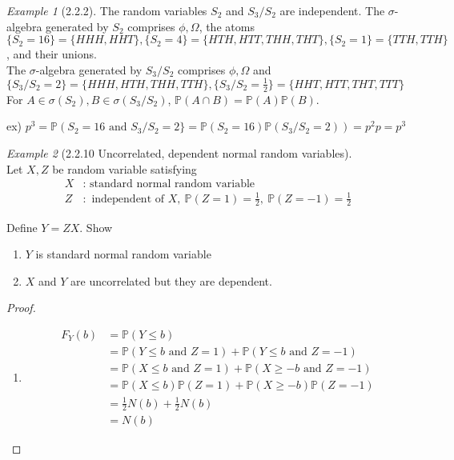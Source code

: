 \documentclass[12pt]{report}
\renewcommand{\1}{\mathbb{1}}
\theoremstyle{break}
\theoremstyle{newdef}
\theoremstyle{remark}
\newtheorem*{exmp}{Example} %
\begin{document}
\begin{appendices}
\begin{exmp}[2.2.2]
The random variables $S_2$ and $S_3/S_2$ are independent.
The $\sigma$-algebra generated by $S_2$ comprises $\phi, \Omega$, the atoms\\
$\{S_2 = 16\} = \{ HHH, HHT\}
, \{S_2=  4\} = \{ HTH, HTT, THH, THT\}
, \{S_2 = 1\} = \{TTH, TTH\}$, and their unions.\\

The $\sigma$-algebra generated by $S_3/S_2$ comprises $\phi, \Omega$ and\\
$\{S_3/S_2 = 2\} = \{HHH, HTH, THH, TTH\}
, \{S_3/S_2 = \frac{1}{2} \} = \{ HHT, HTT, THT, TTT\}$\\

For $A \in \sigma(S_2), B \in \sigma(S_3/S_2)$,
$\mathbb{P}(A \cap B) = \mathbb{P}(A)\mathbb{P}(B)$.

ex) $p^3 = \mathbb{P}(S_2 = 16 \text{ and } S_3/S_2 = 2\} = \mathbb{P}(S_2 = 16)\mathbb{P}(S_3/S_2 = 2)) = p^2 p = p^3$

\end{exmp}

\vspace{5mm}

\begin{exmp}[2.2.10 Uncorrelated, dependent normal random variables]
\leavevmode\\
Let $X, Z$ be random variable satisfying
$$
\begin{aligned}
X&: \text{ standard normal random variable}\\
Z&: \text{ independent of } X,\ \mathbb{P}(Z = 1) = \frac{1}{2},\ \mathbb{P}(Z = -1) = \frac{1}{2}
\end{aligned}
$$

Define $Y = ZX$.
Show
\begin{enumerate}
\item $Y$ is standard normal random variable
\item $X$ and $Y$ are uncorrelated but they are dependent.
\end{enumerate}


\begin{proof}
\leavevmode
\begin{enumerate}
\item
$$
\begin{aligned}
F_Y(b) &= \mathbb{P}(Y \leq b)\\
&= \mathbb{P}(Y \leq b \text{ and } Z = 1)
+ \mathbb{P}(Y \leq b \text{ and } Z = -1)\\
&= \mathbb{P}(X \leq b \text{ and } Z = 1)
+ \mathbb{P}(X \geq -b \text{ and } Z = -1)\\
&= \mathbb{P}(X \leq b)\mathbb{P}(Z=1)
+ \mathbb{P}(X \geq -b)\mathbb{P}(Z=-1)\\
&= \frac{1}{2}N(b) + \frac{1}{2}N(b)\\
&=N(b)
\end{aligned}
$$


\end{enumerate}
\end{proof}
\end{exmp}
\end{appendices}
\end{document}
